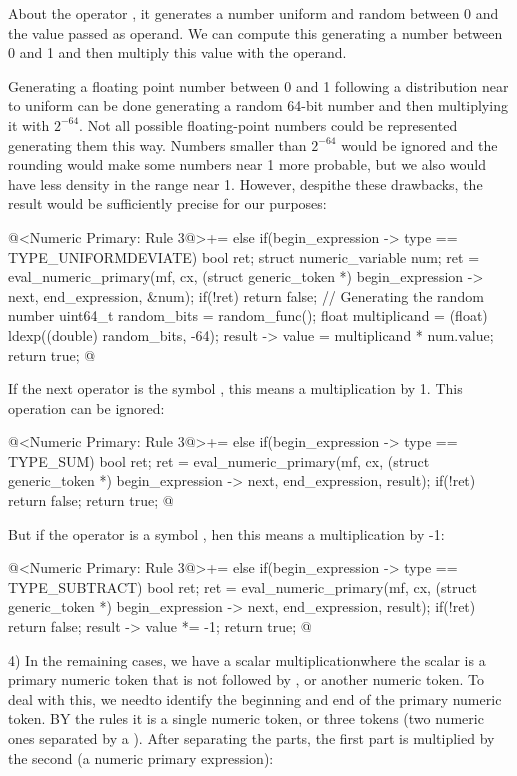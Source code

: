 About the operator , it generates a number
uniform and random between 0 and the value passed as operand. We can
compute this generating a number between 0 and 1 and then multiply
this value with the operand.

Generating a floating point number between 0 and 1 following a
distribution near to uniform can be done generating a random 64-bit
number and then multiplying it with $2^{-64}$. Not all possible
floating-point numbers could be represented generating them this
way. Numbers smaller than $2^{-64}$ would be ignored and the rounding
would make some numbers near 1 more probable, but we also would have
less density in the range near 1. However, despithe these drawbacks,
the result would be sufficiently precise for our purposes:

\iniciocodigo
@<Numeric Primary: Rule 3@>+=
else if(begin_expression -> type == TYPE_UNIFORMDEVIATE){
  bool ret;
  struct numeric_variable num;
  ret = eval_numeric_primary(mf, cx, (struct generic_token *)
                             begin_expression -> next,
                             end_expression, &num);
  if(!ret)
    return false;
  { // Generating the random number
    uint64_t random_bits = random_func();
    float multiplicand = (float) ldexp((double) random_bits, -64);
    result -> value = multiplicand * num.value;
  }
  return true;
}
@
\fimcodigo

If the next operator is the symbol \monoespaco{+}, this means a
multiplication by 1. This operation can be ignored:

\iniciocodigo
@<Numeric Primary: Rule 3@>+=
else if(begin_expression -> type == TYPE_SUM){
  bool ret;
  ret = eval_numeric_primary(mf, cx, (struct generic_token *)
                             begin_expression -> next,
                             end_expression, result);
  if(!ret)
    return false;
  return true;
}
@
\fimcodigo

But if the operator is a symbol \monoespaco{-}, hen this means a
multiplication by -1:

\iniciocodigo
@<Numeric Primary: Rule 3@>+=
else if(begin_expression -> type == TYPE_SUBTRACT){
  bool ret;
  ret = eval_numeric_primary(mf, cx, (struct generic_token *)
                             begin_expression -> next,
                             end_expression, result);
  if(!ret)
    return false;
  result -> value *= -1;
  return true;
}
@
\fimcodigo

4) In the remaining cases, we have a scalar multiplicationwhere the
scalar is a primary numeric token that is not followed
by \monoespaco{+}, \monoespaco{-} or another numeric token. To deal
with this, we needto identify the beginning and end of the primary
numeric token. BY the rules it is a single numeric token, or three
tokens (two numeric ones separated by a \monoespaco{/}). After
separating the parts, the first part is multiplied by the second (a
numeric primary expression):

